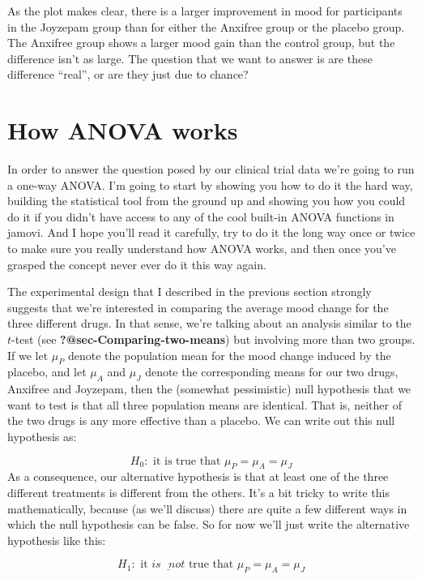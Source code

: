 \documentclass[
  a4paper,
]{book}
\begin{document}
As the plot makes clear, there is a larger improvement in mood for
participants in the Joyzepam group than for either the Anxifree group or
the placebo group. The Anxifree group shows a larger mood gain than the
control group, but the difference isn't as large. The question that we
want to answer is are these difference ``real'', or are they just due to
chance?

\hypertarget{sec-How-ANOVA-works}{%
\section{How ANOVA works}\label{sec-How-ANOVA-works}}

In order to answer the question posed by our clinical trial data we're
going to run a one-way ANOVA. I'm going to start by showing you how to
do it the hard way, building the statistical tool from the ground up and
showing you how you could do it if you didn't have access to any of the
cool built-in ANOVA functions in jamovi. And I hope you'll read it
carefully, try to do it the long way once or twice to make sure you
really understand how ANOVA works, and then once you've grasped the
concept never ever do it this way again.

The experimental design that I described in the previous section
strongly suggests that we're interested in comparing the average mood
change for the three different drugs. In that sense, we're talking about
an analysis similar to the \(t\)-test (see
\textbf{?@sec-Comparing-two-means}) but involving more than two groups.
If we let \(\mu_P\) denote the population mean for the mood change
induced by the placebo, and let \(\mu_A\) and \(\mu_J\) denote the
corresponding means for our two drugs, Anxifree and Joyzepam, then the
(somewhat pessimistic) null hypothesis that we want to test is that all
three population means are identical. That is, neither of the two drugs
is any more effective than a placebo. We can write out this null
hypothesis as:

\[H_0: \text{ it is true that } \mu_P=\mu_A=\mu_J\] As a consequence,
our alternative hypothesis is that at least one of the three different
treatments is different from the others. It's a bit tricky to write this
mathematically, because (as we'll discuss) there are quite a few
different ways in which the null hypothesis can be false. So for now
we'll just write the alternative hypothesis like this:

\[H_1: \text{ it } \underline{ is \text{ } not } \text{ true that }
\mu_P=\mu_A=\mu_J\]
\end{document}
